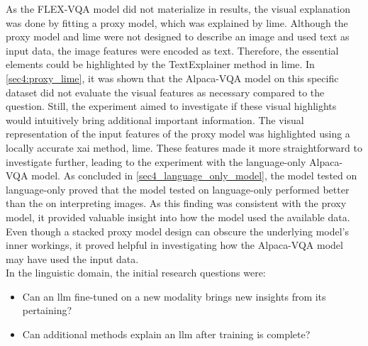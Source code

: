 As the FLEX-VQA model did not materialize in results, the visual explanation was done by fitting a proxy model, which was explained by \gls{lime}. Although the proxy model and \gls{lime} were not designed to describe an image and used text as input data, the image features were encoded as text. Therefore, the essential elements could be highlighted by the TextExplainer method in \gls{lime}. In \autoref{sec4:proxy_lime}, it was shown that the Alpaca-VQA model on this specific dataset did not evaluate the visual features as necessary compared to the question. Still, the experiment aimed to investigate if these visual highlights would intuitively bring additional important information. The visual representation of the input features of the proxy model was highlighted using a locally accurate \gls{xai} method, \gls{lime}. These features made it more straightforward to investigate further, leading to the experiment with the language-only Alpaca-VQA model. As concluded in \autoref{sec4_language_only_model}, the model tested on language-only proved that the model tested on language-only performed better than the on interpreting images. As this finding was consistent with the proxy model, it provided valuable insight into how the model used the available data. 
Even though a stacked proxy model design can obscure the underlying model's inner workings, it proved helpful in investigating how the Alpaca-VQA model may have used the input data.\\


In the linguistic domain, the initial research questions were:
\begin{itemize}
    \item Can an \gls{llm} fine-tuned on a new modality brings new insights from its pertaining?

    \item Can additional methods explain an \gls{llm} after training is complete?
\end{itemize}

